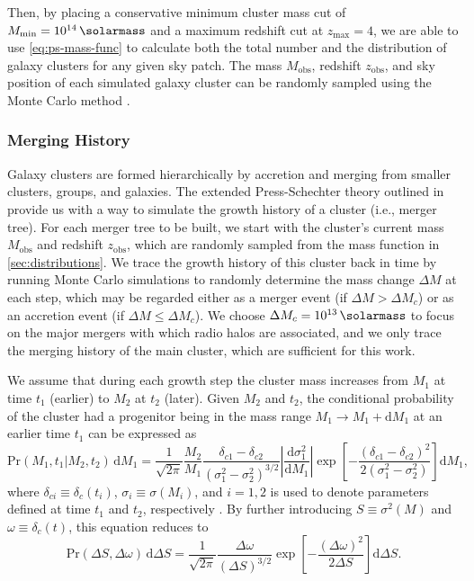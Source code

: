\documentclass[modern]{aastex62}
\newcommand{\R}[1]{\mathrm{#1}}
\newcommand{\D}[1]{\R{d} #1}
\newcommand{\diff}[2]{\frac{\D{#1}}{\D{#2}}}
\begin{document}
Then, by placing a conservative minimum cluster mass cut of
$M_{\R{min}} = \SI{e14}{\solarmass}$ and a maximum redshift cut
at $z_{\R{max}} = 4$, we are able to use \autoref{eq:ps-mass-func}
to calculate both the total number and the distribution of galaxy
clusters for any given sky patch.
The mass $M_{\R{obs}}$, redshift $z_{\R{obs}}$, and sky position of
each simulated galaxy cluster can be randomly sampled using the
Monte Carlo method \citep{wang2010}.


\subsubsection{Merging History}
\label{sec:merging-history}

Galaxy clusters are formed hierarchically by accretion and merging from
smaller clusters, groups, and galaxies.
The extended Press-Schechter theory outlined in \citet{lacey1993} provide
us with a way to simulate the growth history of a cluster (i.e., merger tree).
For each merger tree to be built, we start with the cluster's current
mass $M_{\R{obs}}$ and redshift $z_{\R{obs}}$, which are randomly sampled
from the mass function in \autoref{sec:distributions}.
We trace the growth history of this cluster back in time by running
Monte Carlo simulations to randomly determine the mass change
$\Delta M$ at each step, which may be regarded
either as a merger event (if $\Delta M > \Delta M_c$)
or as an accretion event (if $\Delta M \leq \Delta M_c$).
We choose $\Delta M_c = \SI{e13}{\solarmass}$ to focus on the major mergers
with which radio halos are associated,
and we only trace the merging history of the main cluster,
which are sufficient for this work.

We assume that during each growth step the cluster mass increases from
$M_1$ at time $t_1$ (earlier) to $M_2$ at $t_2$ (later).
Given $M_2$ and $t_2$, the conditional probability of the cluster had
a progenitor being in the mass range $M_1 \to M_1 + \D{M_1}$ at an
earlier time $t_1$ can be expressed as
\begin{equation}
  \label{eq:eps-condprob}
  \R{Pr}(M_1, t_1 | M_2, t_2) \,\D{M_1} = \frac{1}{\sqrt{2\pi}}
\frac{M_2}{M_1}
  \frac{\delta_{c1} - \delta_{c2}}{(\sigma_1^2 - \sigma_2^2)^{3/2}}
  \left| \diff{\sigma_1^2}{M_1} \right|
  \exp \!\left[ -\frac{(\delta_{c1} - \delta_{c2})^2}
    {2(\sigma_1^2 - \sigma_2^2)} \right] \D{M_1},
\end{equation}
where
$\delta_{ci} \equiv \delta_c(t_i)$, $\sigma_i \equiv \sigma(M_i)$, and $i =
1, 2$ is used to denote parameters defined at time $t_1$ and $t_2$,
respectively \citep{lacey1993,randall2002}.
By further introducing $S \equiv \sigma^2(M)$ and
$\omega \equiv \delta_c(t)$, this equation reduces to
\begin{equation}
  \label{eq:eps-condprob-simp}
  \R{Pr}(\Delta S, \Delta \omega) \,\D{\Delta S} = \frac{1}{\sqrt{2\pi}}
  \frac{\Delta\omega}{(\Delta S)^{3/2}}
  \exp \!\left[ -\frac{(\Delta\omega)^2}{2 \Delta S} \right] \D{\Delta S}.
\end{equation}
\end{document}
